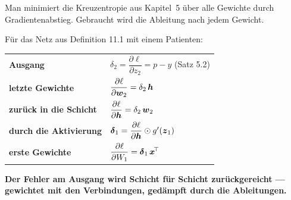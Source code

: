 \begin{merksatz}
Man minimiert die Kreuzentropie aus Kapitel~5 über alle Gewichte durch Gradientenabstieg. Gebraucht wird die Ableitung nach jedem Gewicht.

Für das Netz aus Definition 11.1 mit einem Patienten:

\begin{center}
{\small
\renewcommand{\arraystretch}{1.6}
\begin{tabular}{@{}P{2.8cm}P{5.8cm}@{}}
\toprule
\textbf{Ausgang} & $\delta_2 = \dfrac{\partial\ell}{\partial z_2} = p - y$ \quad (Satz 5.2)\\
\textbf{letzte Gewichte} & $\dfrac{\partial\ell}{\partial\boldsymbol{w}_2} = \delta_2\,\boldsymbol{h}$\\
\textbf{zurück in die Schicht} & $\dfrac{\partial\ell}{\partial\boldsymbol{h}} = \delta_2\,\boldsymbol{w}_2$\\
\textbf{durch die Aktivierung} & $\boldsymbol{\delta}_1 = \dfrac{\partial\ell}{\partial\boldsymbol{h}}\odot g'(\boldsymbol{z}_1)$\\
\textbf{erste Gewichte} & $\dfrac{\partial\ell}{\partial W_1} = \boldsymbol{\delta}_1\,\boldsymbol{x}^{\!\top}$\\
\bottomrule
\end{tabular}}
\end{center}

\begin{center}
\begin{minipage}{0.9\textwidth}
\textbf{Der Fehler am Ausgang wird Schicht für Schicht zurückgereicht --- gewichtet mit den Verbindungen, gedämpft durch die Ableitungen.}
\end{minipage}
\end{center}

\begin{center}
\begin{minipage}{0.88\textwidth}
\end{minipage}
\end{center}
\end{merksatz}


